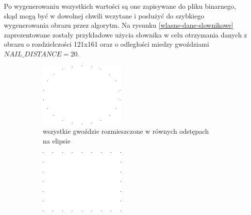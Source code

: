 \documentclass[a4paper, 12pt, polish, twoside]{extreport}
\begin{document}
    Po wygenerowaniu wszystkich wartości są one zapisywane do pliku binarnego, skąd mogą być w dowolnej chwili wczytane i posłużyć do szybkiego wygenerowania obrazu przez algorytm. Na rysunku \ref{wlasne-dane-slownikowe} zaprezentowane zostały przykładowe użycia słownika w celu otrzymania danych z obrazu o rozdzielczości 121x161 oraz o odległości miedzy gwoździami \(NAIL\_DISTANCE = 20\).
    \begin{figure}[H] 
    \centering
    \begin{subfigure}{0.49\textwidth}
        \centering
        \includegraphics[width = \textwidth]{img/4-mine/nails-on-elipse.png}
        \caption{wszystkie gwoździe rozmieszczone w równych odstępach na elipsie}
        \label{wlasne-dane-slownikowe-1}
    \end{subfigure}
    \begin{subfigure}{0.49\textwidth}
        \centering
        \includegraphics[width = \textwidth]{img/4-mine/nails-on-rectangle.png}

\end{subfigure}
\end{figure}
\end{document}
